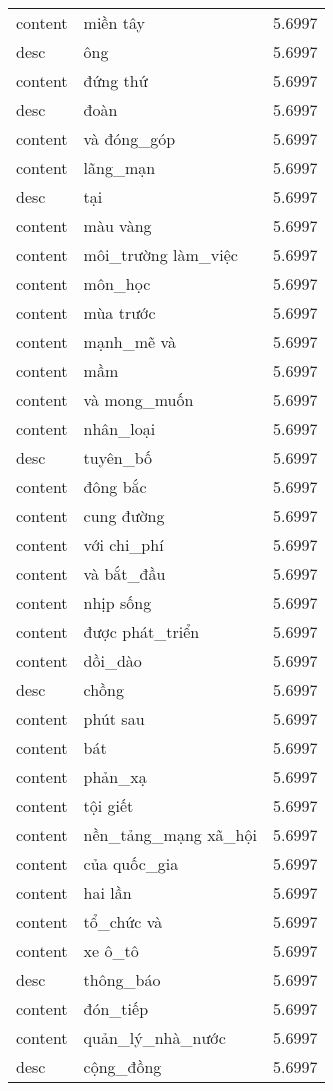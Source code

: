 \documentclass{article}
\begin{document}
\begin{tabular}{lll}
content & miền tây & 5.6997\\
desc & ông & 5.6997\\
content & đứng thứ & 5.6997\\
desc & đoàn & 5.6997\\
content & và đóng\_góp & 5.6997\\
content & lãng\_mạn & 5.6997\\
desc & tại & 5.6997\\
content & màu vàng & 5.6997\\
content & môi\_trường làm\_việc & 5.6997\\
content & môn\_học & 5.6997\\
content & mùa trước & 5.6997\\
content & mạnh\_mẽ và & 5.6997\\
content & mầm & 5.6997\\
content & và mong\_muốn & 5.6997\\
content & nhân\_loại & 5.6997\\
desc & tuyên\_bố & 5.6997\\
content & đông bắc & 5.6997\\
content & cung đường & 5.6997\\
content & với chi\_phí & 5.6997\\
content & và bắt\_đầu & 5.6997\\
content & nhịp sống & 5.6997\\
content & được phát\_triển & 5.6997\\
content & dồi\_dào & 5.6997\\
desc & chồng & 5.6997\\
content & phút sau & 5.6997\\
content & bát & 5.6997\\
content & phản\_xạ & 5.6997\\
content & tội giết & 5.6997\\
content & nền\_tảng\_mạng xã\_hội & 5.6997\\
content & của quốc\_gia & 5.6997\\
content & hai lần & 5.6997\\
content & tổ\_chức và & 5.6997\\
content & xe ô\_tô & 5.6997\\
desc & thông\_báo & 5.6997\\
content & đón\_tiếp & 5.6997\\
content & quản\_lý\_nhà\_nước & 5.6997\\
desc & cộng\_đồng & 5.6997\\

\end{tabular}
\end{document}
